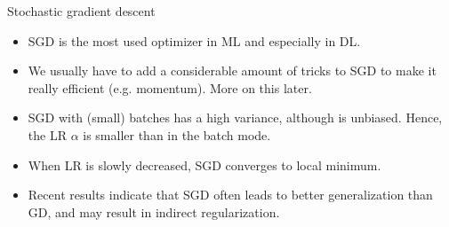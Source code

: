 \documentclass[11pt,compress,t,notes=noshow, xcolor=table]{beamer}
\begin{document}
\begin{vbframe}{Stochastic gradient descent}
  \begin{itemize}
    \item SGD is the most used optimizer in ML and especially in DL.
    \item We usually have to add a considerable amount of tricks to SGD to make it really 
        efficient (e.g. momentum). More on this later.
    \item SGD with (small) batches has a high variance, although is unbiased. 
      Hence, the LR $\alpha$ is smaller than in the batch mode.
    \item When LR is slowly decreased, SGD converges to  local minimum.
    \item Recent results indicate that SGD often leads to better generalization than GD, and may result in indirect regularization.
   \end{itemize}
\vspace*{0.5cm}



\end{vbframe}
\end{document}
